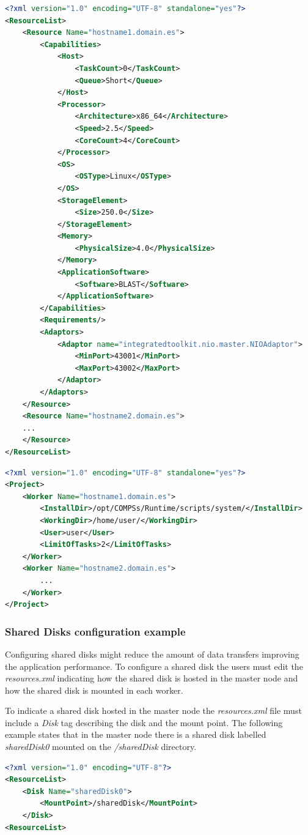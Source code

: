 \begin{lstlisting}[language=xml]
<?xml version="1.0" encoding="UTF-8" standalone="yes"?>
<ResourceList>
    <Resource Name="hostname1.domain.es">
        <Capabilities>
            <Host>
                <TaskCount>0</TaskCount>
                <Queue>Short</Queue>
            </Host>
            <Processor>
                <Architecture>x86_64</Architecture>
                <Speed>2.5</Speed>
                <CoreCount>4</CoreCount>
            </Processor>
            <OS>
                <OSType>Linux</OSType>
            </OS>
            <StorageElement>
                <Size>250.0</Size>
            </StorageElement>
            <Memory>
                <PhysicalSize>4.0</PhysicalSize>
            </Memory>
            <ApplicationSoftware>
                <Software>BLAST</Software>
            </ApplicationSoftware>
        </Capabilities>
        <Requirements/>
        <Adaptors>
            <Adaptor name="integratedtoolkit.nio.master.NIOAdaptor">
                <MinPort>43001</MinPort>
                <MaxPort>43002</MaxPort>
            </Adaptor>
        </Adaptors>
    </Resource>
    <Resource Name="hostname2.domain.es">
	...
    </Resource>
</ResourceList>
\end{lstlisting}

\begin{lstlisting}[language=xml]
<?xml version="1.0" encoding="UTF-8" standalone="yes"?>
<Project>
    <Worker Name="hostname1.domain.es">
        <InstallDir>/opt/COMPSs/Runtime/scripts/system/</InstallDir>
        <WorkingDir>/home/user/</WorkingDir>
        <User>user</User>
        <LimitOfTasks>2</LimitOfTasks>
    </Worker>
    <Worker Name="hostname2.domain.es">
        ...
    </Worker>
</Project>
\end{lstlisting}


\subsubsection{Shared Disks configuration example}
Configuring shared disks might reduce the amount of data transfers improving the application performance. To configure a 
shared disk the users must edit the \textit{resources.xml} indicating how the shared disk is hosted in the master node 
and how the shared disk is mounted in each worker. 

To indicate a shared disk hosted in the master node the \textit{resources.xml} file must include a \textit{Disk} tag describing
the disk and the mount point. The following example states that in the master node there is a shared disk labelled 
\textit{sharedDisk0} mounted on the \textit{/sharedDisk} directory.
\begin{lstlisting}[language=xml]
<?xml version="1.0" encoding="UTF-8"?>
<ResourceList>
    <Disk Name="sharedDisk0">
        <MountPoint>/sharedDisk</MountPoint>
    </Disk>
<ResourceList>
\end{lstlisting}

